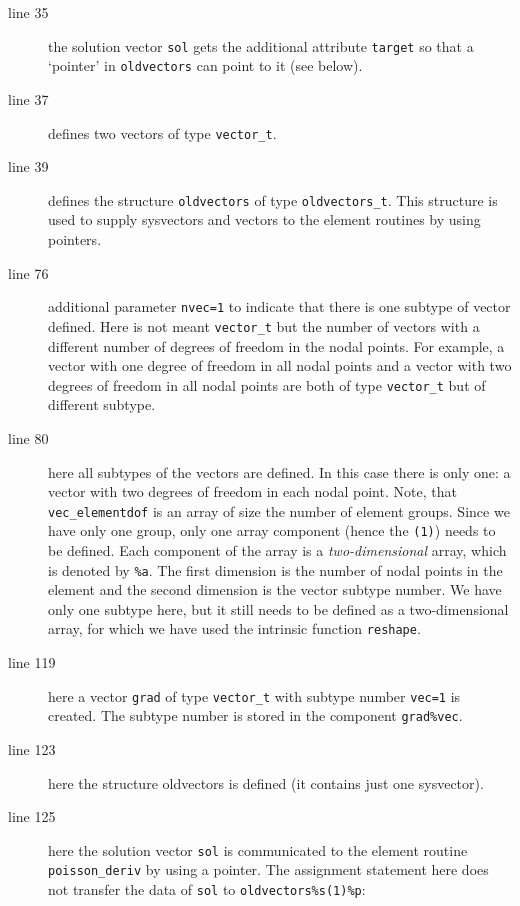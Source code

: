 \begin{description}
   \item[line 35] the solution vector \texttt{sol} gets the additional
attribute \texttt{target} so that a `pointer' in
\texttt{oldvectors} can point to it (see below).
   \item[line 37] defines two vectors of type \texttt{vector\_t}.
   \item[line 39] defines the structure \texttt{oldvectors} of
      type \texttt{oldvectors\_t}. This structure is used to supply sysvectors
      and vectors to the element routines by using pointers.
   \item[line 76] additional parameter \texttt{nvec=1} to indicate that there
     is one subtype of vector defined.
     Here is not meant \texttt{vector\_t} but
     the number of vectors with a different number of degrees of freedom in the
     nodal points. For
     example, a vector with one degree of freedom in all nodal points and a
     vector with two degrees of freedom in all nodal points are both of type
     \texttt{vector\_t} but of different subtype. 
  \item[line 80] here all subtypes of the vectors are defined. In this case
     there is only one: a vector with two degrees of freedom in each nodal
     point. Note, that \texttt{vec\_elementdof} is an array of size the number
     of element groups. Since we have only one group, only one array
     component (hence the \texttt{(1)}) needs to be defined. Each component of
     the array is a \emph{two-dimensional} array, which is denoted by
     \texttt{\%a}. The first dimension is the number of nodal points in the
     element and the second dimension is the vector subtype number. We have
     only one subtype here, but it still needs to be defined as a
    two-dimensional array, for which we have used the intrinsic function
      \texttt{reshape}.
   \item[line 119] here a vector \texttt{grad}
     of type \texttt{vector\_t} with subtype number 
     \texttt{vec=1} is created. The subtype number is stored in the component
     \texttt{grad\%vec}.
   \item[line 123] here the structure oldvectors is defined (it contains just
     one sysvector).
   \item[line 125] here the solution vector \texttt{sol} is communicated to the
     element routine \texttt{poisson\_deriv} by using a pointer. The
     assignment statement here does not transfer the data of \texttt{sol} to
     \texttt{oldvectors\%s(1)\%p}:

\end{description}
